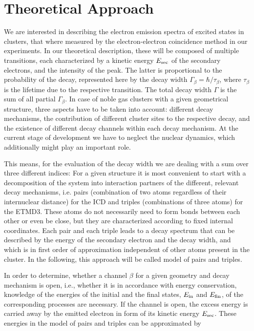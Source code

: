\section{Theoretical Approach}
%
We are interested in describing the electron emission spectra of excited states in clusters, that where measured by the electron-electron coincidence method in our experiments. 
In our theoretical description, these will be composed of multiple transitions, each characterized by a kinetic energy $E_{\rm sec}$ of the secondary electrons, and the intensity of the peak.
The latter is proportional to the probability of the decay, represented here by the decay width $\Gamma_\beta = \hbar/\tau_\beta$, where $\tau_\beta$ is the lifetime due to the respective transition.
The total decay width $\Gamma$ is the sum of all partial $\Gamma_\beta$.
In case of noble gas clusters with a given geometrical structure, three aspects have to be taken into account:
different decay mechanisms, the contribution of different cluster sites to the respective decay, and the existence of different decay channels within each decay mechanism.
At the current stage of development we have to neglect the nuclear dynamics, which
additionally might play an important role.

This means, for the evaluation of the decay width we are dealing with a sum over three different indices: 
For a given structure it is most convenient to
start with a decomposition of the system into interaction partners of
the different, relevant decay mechanisms, i.e. pairs (combination of two atoms regardless
of their internuclear distance) for the ICD and triples (combinations of three atoms)
for the ETMD3.
These atoms do not necessarily need to form bonds between each other or
even be close, but they are characterized according to fixed internal
coordinates. 
Each pair and each triple leads to a decay spectrum that can be described by the energy of the secondary electron and the decay width, and which is in first order of approximation independent of other atoms present in the cluster.
In the following, this approach will be called model of pairs and triples.



In order to determine, whether a channel $\beta$ for a given geometry and decay
mechanism is open, i.e., whether it is in accordance with energy conservation,
knowledge of the energies of the initial and the final states, $E_{\rm in}$ and $E_{\rm fin}$, of
the corresponding processes are necessary.
If the channel
is open, the excess energy is carried away by the emitted electron
in form of its kinetic energy $E_{\rm sec}$. These energies in the model
of pairs and triples can be approximated by

